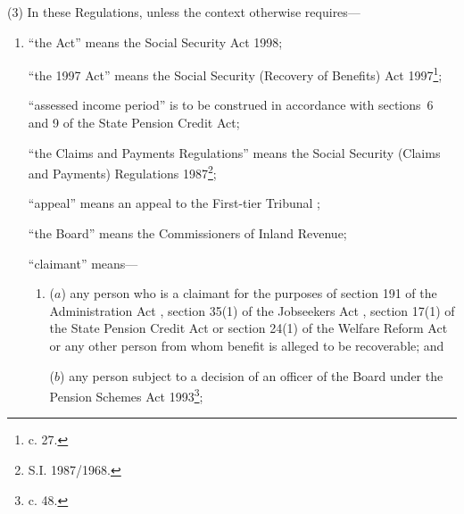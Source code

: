 \documentclass[12pt,a4paper]{article}
\begin{document}
(3) In these Regulations, unless the context otherwise requires—
\begin{enumerate}\item[]
“the Act” means the Social Security Act 1998;

“the 1997 Act” means the Social Security (Recovery of Benefits) Act 1997\footnote{ c. 27.};

“assessed income period” is to be construed in accordance with sections~6 and 9 of the State Pension Credit Act;

“the Claims and Payments Regulations” means the Social Security (Claims and Payments) Regulations 1987\footnote{\frenchspacing S.I. 1987/1968.};

“appeal” means an appeal to 
the First-tier Tribunal%
;

“the Board” means the Commissioners of Inland Revenue;

“claimant” means—
\begin{enumerate}\item[]
($a$) any person who is a claimant for the purposes of section 191 of the Administration Act%
, section 35(1) of the Jobseekers Act%
, section 17(1) of the State Pension Credit Act or section 24(1) of the Welfare Reform Act  %
or any other person from whom benefit is alleged to be recoverable; and

($b$) any person subject to a decision of 
an officer of the Board  %
under the Pension Schemes Act 1993\footnote{ c. 48.};
\end{enumerate}




\end{enumerate}
\end{document}
